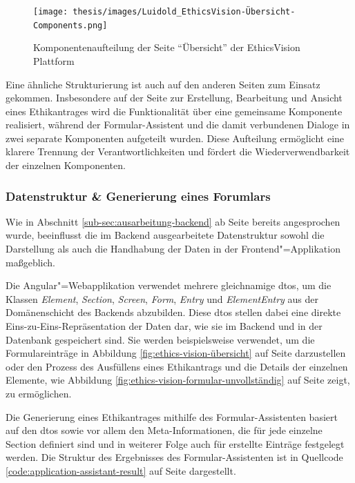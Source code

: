 \documentclass[a4paper,12pt,twoside]{scrreprt}
\begin{document}
\begin{figure}[ht]
    \centering
    \texttt{[image: thesis/images/Luidold\_EthicsVision-Übersicht-Components.png]}
    \caption{Komponentenaufteilung der Seite \enquote{Übersicht} der EthicsVision Plattform}
    \label{fig:ethics-vision-übersicht-components}
\end{figure}

Eine ähnliche Strukturierung ist auch auf den anderen Seiten zum Einsatz gekommen. Insbesondere auf der Seite zur Erstellung, Bearbeitung und Ansicht eines Ethikantrages wird die Funktionalität über eine gemeinsame Komponente realisiert, während der Formular-Assistent und die damit verbundenen Dialoge in zwei separate Komponenten aufgeteilt wurden. Diese Aufteilung ermöglicht eine klarere Trennung der Verantwortlichkeiten und fördert die Wiederverwendbarkeit der einzelnen Komponenten.

\subsubsection*{Datenstruktur \& Generierung eines Forumlars}
\label{sub-sub-sec:angular-datenstruktur-generierung-formular}

Wie in Abschnitt \ref{sub-sec:ausarbeitung-backend} ab Seite \pageref{sub-sec:ausarbeitung-backend} bereits angesprochen wurde, beeinflusst die im Backend ausgearbeitete Datenstruktur sowohl die Darstellung als auch die Handhabung der Daten in der Frontend"=Applikation maßgeblich.

Die Angular"=Webapplikation verwendet mehrere gleichnamige \aclp{dto}, um die Klassen \textit{Element}, \textit{Section}, \textit{Screen}, \textit{Form}, \textit{Entry} und \textit{ElementEntry} aus der Domänenschicht des Backends abzubilden. Diese \ac{dto}s stellen dabei eine direkte Eins-zu-Eins-Repräsentation der Daten dar, wie sie im Backend und in der Datenbank gespeichert sind. Sie werden beispielsweise verwendet, um die Formulareinträge in Abbildung \ref{fig:ethics-vision-übersicht} auf Seite \pageref{fig:ethics-vision-übersicht} darzustellen oder den Prozess des Ausfüllens eines Ethikantrags und die Details der einzelnen Elemente, wie Abbildung \ref{fig:ethics-vision-formular-unvollständig} auf Seite \pageref{fig:ethics-vision-formular-unvollständig} zeigt, zu ermöglichen.

\medskip

Die Generierung eines Ethikantrages mithilfe des Formular-Assistenten basiert auf den \ac{dto}s sowie vor allem den Meta-Informationen, die für jede einzelne Section definiert sind und in weiterer Folge auch für erstellte Einträge festgelegt werden. Die Struktur des Ergebnisses des Formular-Assistenten ist in Quellcode \ref{code:application-assistant-result} auf Seite \pageref{code:application-assistant-result} dargestellt.
\end{document}
